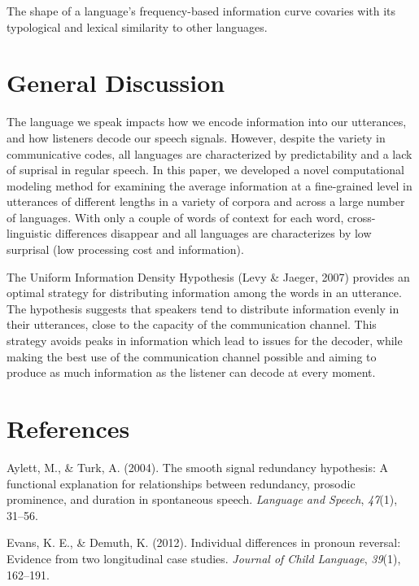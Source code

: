 \documentclass[11pt,]{article}
\begin{document}
The shape of a language's frequency-based information curve covaries with its typological and lexical similarity to other languages.

\hypertarget{general-discussion}{%
\section{General Discussion}\label{general-discussion}}

The language we speak impacts how we encode information into our utterances, and how listeners decode our speech signals. However, despite the variety in communicative codes, all languages are characterized by predictability and a lack of suprisal in regular speech. In this paper, we developed a novel computational modeling method for examining the average information at a fine-grained level in utterances of different lengths in a variety of corpora and across a large number of languages. With only a couple of words of context for each word, cross-linguistic differences disappear and all languages are characterizes by low surprisal (low processing cost and information).

The Uniform Information Density Hypothesis (Levy \& Jaeger, 2007) provides an optimal strategy for distributing information among the words in an utterance. The hypothesis suggests that speakers tend to distribute information evenly in their utterances, close to the capacity of the communication channel. This strategy avoids peaks in information which lead to issues for the decoder, while making the best use of the communication channel possible and aiming to produce as much information as the listener can decode at every moment.

\hypertarget{references}{%
\section*{References}\label{references}}

\hypertarget{refs}{}
\leavevmode\hypertarget{ref-aylett2004smooth}{}%
Aylett, M., \& Turk, A. (2004). The smooth signal redundancy hypothesis: A functional explanation for relationships between redundancy, prosodic prominence, and duration in spontaneous speech. \emph{Language and Speech}, \emph{47}(1), 31--56.

\leavevmode\hypertarget{ref-evans2012individual}{}%
Evans, K. E., \& Demuth, K. (2012). Individual differences in pronoun reversal: Evidence from two longitudinal case studies. \emph{Journal of Child Language}, \emph{39}(1), 162--191.
\end{document}
